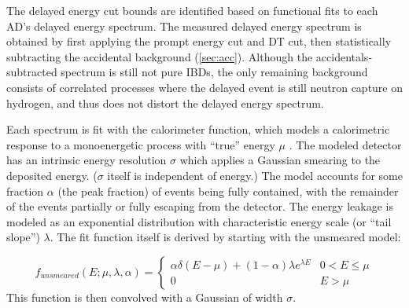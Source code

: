 The delayed energy cut bounds are identified based on
functional fits to each AD's delayed energy spectrum.
The measured delayed energy spectrum is obtained by first applying
the prompt energy cut and DT cut,
then statistically subtracting the accidental background (\cref{sec:acc}).
Although the accidentals-subtracted spectrum is still not pure IBDs,
the only remaining background consists of correlated processes
where the delayed event is still
neutron capture on hydrogen, and thus does not distort
the delayed energy spectrum.

Each spectrum is fit with the calorimeter function, which models
a calorimetric response to a monoenergetic process with ``true''
energy $\mu$ \cite{calorimeter2016}.
The modeled detector has an intrinsic energy resolution $\sigma$
which applies a Gaussian smearing to the deposited energy.
($\sigma$ itself is independent of energy.)
The model accounts for some fraction $\alpha$ (the peak fraction)
of events being fully contained,
with the remainder of the events partially or fully escaping from the detector.
The energy leakage is modeled as an exponential distribution
with characteristic energy scale (or ``tail slope'') $\lambda$.
The fit function itself is derived by starting with
the unsmeared model:

\begin{equation}
    f_{unsmeared}(E;\mu,\lambda,\alpha) =
    \begin{cases}
        \alpha\delta(E-\mu) + (1-\alpha)\lambda e^{\lambda E}
        & 0 < E \leq \mu \\
        0 & E > \mu
    \end{cases}
\end{equation}
This function is then convolved with a Gaussian
of width $\sigma$.

